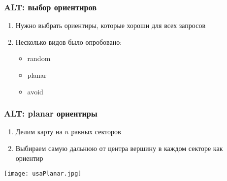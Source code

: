 \documentclass{beamer}
\begin{document}
\begin{frame}
\frametitle{ALT: выбор ориентиров}
\begin{enumerate}	
\item Нужно выбрать ориентиры, которые хороши для всех запросов
\item Несколько видов было опробовано:
	\begin{itemize}
    \item random
    \item planar
    \item avoid
    \end{itemize}
\end{enumerate}
\end{frame}


\begin{frame}
\frametitle{ALT: planar ориентиры}
\begin{enumerate}	
\item Делим карту на $n$ равных секторов
\item Выбираем самую дальнюю от центра вершину в каждом секторе как ориентир
\end{enumerate}
\texttt{[image: usaPlanar.jpg]}
\end{frame}
\end{document}
